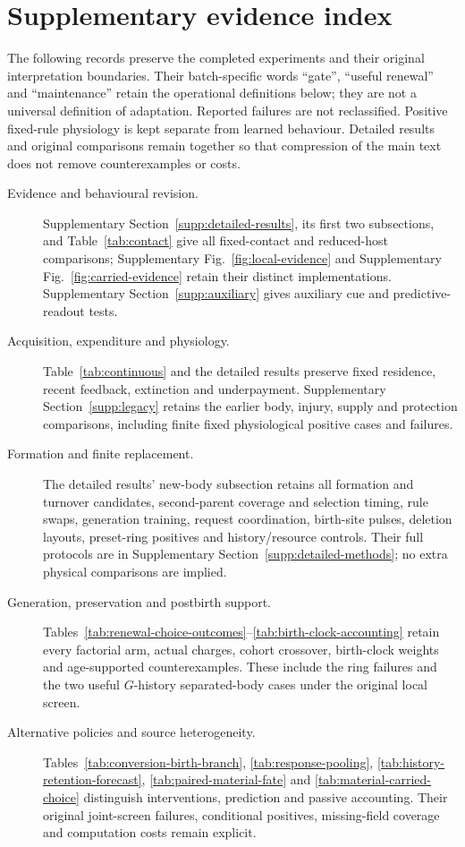 \section{Supplementary evidence index}\label{supp:index}
The following records preserve the completed experiments and their original interpretation boundaries. Their batch-specific words ``gate'', ``useful renewal'' and ``maintenance'' retain the operational definitions below; they are not a universal definition of adaptation. Reported failures are not reclassified. Positive fixed-rule physiology is kept separate from learned behaviour. Detailed results and original comparisons remain together so that compression of the main text does not remove counterexamples or costs.

\begin{description}
\item[Evidence and behavioural revision.] Supplementary Section~\ref{supp:detailed-results}, its first two subsections, and Table~\ref{tab:contact} give all fixed-contact and reduced-host comparisons; Supplementary Fig.~\ref{fig:local-evidence} and Supplementary Fig.~\ref{fig:carried-evidence} retain their distinct implementations. Supplementary Section~\ref{supp:auxiliary} gives auxiliary cue and predictive-readout tests.
\item[Acquisition, expenditure and physiology.] Table~\ref{tab:continuous} and the detailed results preserve fixed residence, recent feedback, extinction and underpayment. Supplementary Section~\ref{supp:legacy} retains the earlier body, injury, supply and protection comparisons, including finite fixed physiological positive cases and failures.
\item[Formation and finite replacement.] The detailed results' new-body subsection retains all formation and turnover candidates, second-parent coverage and selection timing, rule swaps, generation training, request coordination, birth-site pulses, deletion layouts, preset-ring positives and history/resource controls. Their full protocols are in Supplementary Section~\ref{supp:detailed-methods}; no extra physical comparisons are implied.
\item[Generation, preservation and postbirth support.] Tables~\ref{tab:renewal-choice-outcomes}--\ref{tab:birth-clock-accounting} retain every factorial arm, actual charges, cohort crossover, birth-clock weights and age-supported counterexamples. These include the ring failures and the two useful $G$-history separated-body cases under the original local screen.
\item[Alternative policies and source heterogeneity.] Tables~\ref{tab:conversion-birth-branch}, \ref{tab:response-pooling}, \ref{tab:history-retention-forecast}, \ref{tab:paired-material-fate} and \ref{tab:material-carried-choice} distinguish interventions, prediction and passive accounting. Their original joint-screen failures, conditional positives, missing-field coverage and computation costs remain explicit.

\end{description}
